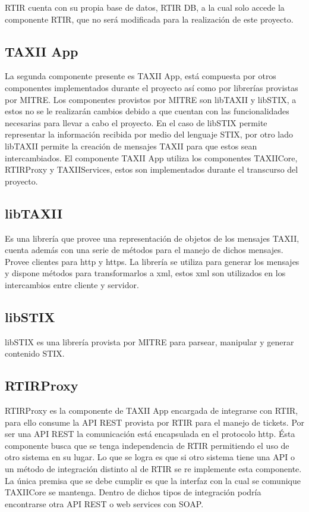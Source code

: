	RTIR cuenta con su propia base de datos, RTIR DB, a la cual solo accede la componente RTIR, que no será modificada para la realización de este proyecto.
	
	
	\bigskip
	
	\subsection{TAXII App}
	
	\bigskip
	
	La segunda componente presente es TAXII App, está compuesta por otros componentes
		implementados durante el proyecto así como por librerías provistas por MITRE. Los componentes provistos por MITRE son
		libTAXII y libSTIX, a estos no se le realizarán cambios debido a que cuentan con las funcionalidades necesarias para
		llevar a cabo el proyecto. En el caso de libSTIX permite representar la información recibida por medio del lenguaje
		STIX, por otro lado libTAXII permite la creación de mensajes TAXII para que estos sean intercambiados. El componente
		TAXII App utiliza los componentes TAXIICore, RTIRProxy y TAXIIServices, estos son implementados durante el transcurso
		del proyecto.
	
	\subsection{libTAXII}
	Es una librería que provee una representación de objetos de los mensajes TAXII, cuenta además
		con una serie de métodos para el manejo de dichos mensajes. Provee clientes para http y https. La librería se utiliza
		para generar los mensajes y dispone métodos para transformarlos a xml, estos xml son utilizados en los intercambios
		entre cliente y servidor.
	
	\subsection{libSTIX}
	libSTIX es una librería provista por MITRE para parsear, manipular y generar contenido STIX.
	
	\subsection{RTIRProxy}
	RTIRProxy es la componente de TAXII App encargada de integrarse con RTIR, para ello consume la
		API REST provista por RTIR para el manejo de tickets. Por ser una API REST la comunicación está encapsulada en el
		protocolo http. Ésta componente busca que se tenga independencia de RTIR permitiendo el uso de otro sistema en su
		lugar. Lo que se logra es que si otro sistema tiene una API
		o un método de integración distinto al de RTIR se re implemente esta componente. La única premisa que se debe cumplir
		es que la interfaz con la cual se comunique TAXIICore se mantenga. Dentro de dichos tipos de integración podría
		encontrarse otra API REST o web services con SOAP.
	
